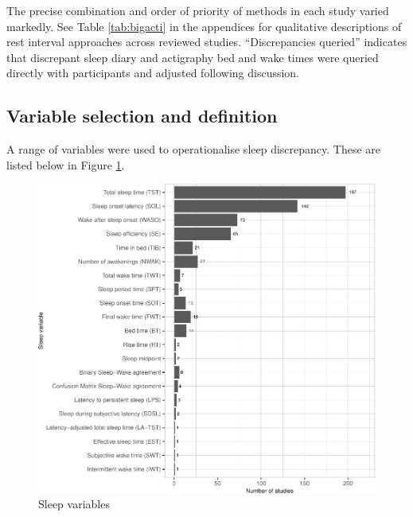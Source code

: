 \documentclass[
]{article}
\begin{document}
The precise combination and order of priority of methods in each study varied markedly. See Table \ref{tab:bigacti} in the appendices for qualitative descriptions of rest interval approaches across reviewed studies. ``Discrepancies queried'' indicates that discrepant sleep diary and actigraphy bed and wake times were queried directly with participants and adjusted following discussion.

\subsection{Variable selection and definition}\label{variable-selection-and-definition}

A range of variables were used to operationalise sleep discrepancy. These are listed below in Figure \ref{fig:vargraph}.

\begin{figure}
\centering
\includegraphics{review_markdown_files/figure-latex/vargraph-1.pdf}
\caption{\label{fig:vargraph}Sleep variables}
\end{figure}
\end{document}
